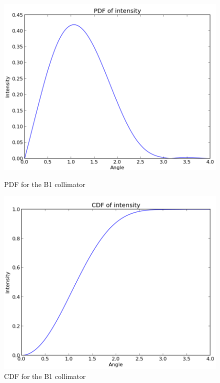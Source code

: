 \begin{figure}
    \centering
    
    \begin{minipage}{0.5\textwidth}
        \centering
        \includegraphics[width=\textwidth]{Figures/B1_coll_pdf.png} %
        \caption{PDF for the B1 collimator}
    \end{minipage}\hfill
    \begin{minipage}{0.5\textwidth}
        \centering
        \includegraphics[width=\textwidth]{Figures/B1_coll_cdf.png} %
        \caption{CDF for the B1 collimator }
        \label{fig:B1_PDF_CDF_coll}
    \end{minipage}
\end{figure}

